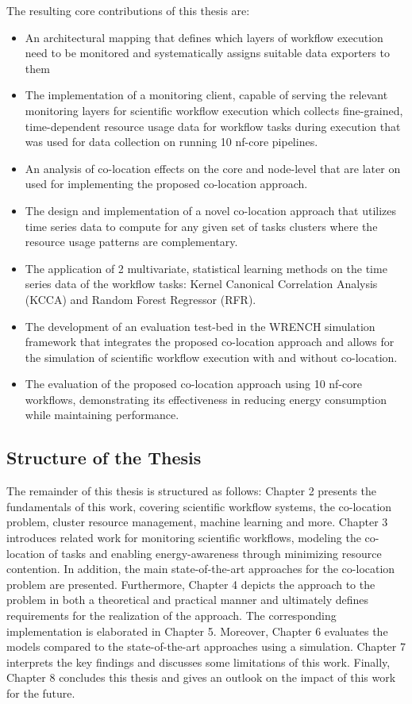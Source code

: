 The resulting core contributions of this thesis are:
\begin{itemize}
    \item An architectural mapping that defines which layers of workflow execution need to be monitored and systematically assigns suitable data exporters to them
    \item The implementation of a monitoring client, capable of serving the relevant monitoring layers for scientific workflow execution which collects fine-grained, time-dependent resource usage data for workflow tasks during execution that was used for data collection on running 10 nf-core pipelines.
    \item An analysis of co-location effects on the core and node-level that are later on used for implementing the proposed co-location approach.
    \item The design and implementation of a novel co-location approach that utilizes time series data to compute for any given set of tasks clusters where the resource usage patterns are complementary.
    \item The application of 2 multivariate, statistical learning methods on the time series data of the workflow tasks: Kernel Canonical Correlation Analysis (KCCA) and Random Forest Regressor (RFR).
    \item The development of an evaluation test-bed in the WRENCH simulation framework that integrates the proposed co-location approach and allows for the simulation of scientific workflow execution with and without co-location.
    \item The evaluation of the proposed co-location approach using 10 nf-core workflows, demonstrating its effectiveness in reducing energy consumption  while maintaining performance.
\end{itemize}

\subsection{Structure of the Thesis}
\label{subse:structure_of_the_thesis}
The remainder of this thesis is structured as follows: Chapter 2 presents the fundamentals of this work, covering scientific workflow systems, the co-location problem, cluster resource management, machine learning and more. Chapter 3 introduces related work for monitoring scientific workflows, modeling the co-location of tasks and enabling energy-awareness through minimizing resource contention. In addition, the main state-of-the-art approaches for the co-location problem are presented. Furthermore, Chapter 4 depicts the approach to the problem in both a theoretical and practical manner and ultimately defines requirements for the realization of the approach. The corresponding implementation is elaborated in Chapter 5. Moreover, Chapter 6 evaluates the models compared to the state-of-the-art approaches using a simulation. Chapter 7 interprets the key findings and discusses some limitations of this work. Finally, Chapter 8 concludes this thesis and gives an outlook on the impact of this work for the future.